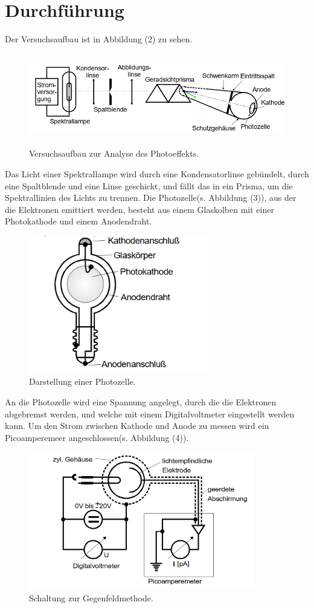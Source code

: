 \section{Durchführung}
\label{sec:Durchführung}

Der Versuchsaufbau ist in Abbildung (2) zu sehen.
\begin{figure}[H]
  \centering
  \includegraphics[height=4cm]{aufbau.PNG}
  \caption{Versuchsaufbau zur Analyse des Photoeffekts. \cite{kent}}
\end{figure}
Das Licht einer Spektrallampe wird durch eine Kondensatorlinse gebündelt, durch eine Spaltblende und eine Linse geschickt, und fällt das in ein Prisma, um die Spektrallinien des Lichts zu trennen.
Die Photozelle(s. Abbildung (3)), aus der die Elektronen emittiert werden, besteht aus einem Glaskolben mit einer Photokathode und einem Anodendraht. 
\begin{figure}[H]
  \centering
  \includegraphics[height=6cm]{photo.PNG}
  \caption{Darstellung einer Photozelle. \cite{kent}}
\end{figure}
An die Photozelle wird eine Spannung angelegt, durch die die Elektronen abgebremst werden, und welche mit einem Digitalvoltmeter eingestellt werden kann. Um den Strom zwischen Kathode und Anode zu messen wird ein Picoamperemeer angeschlossen(s. Abbildung (4)). 
\begin{figure}[H]
  \centering
  \includegraphics[height=6cm]{schaltung.PNG}
  \caption{Schaltung zur Gegenfeldmethode. \cite{kent}}
\end{figure}
